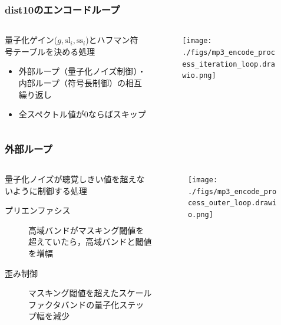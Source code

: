 \documentclass[14pt,xcolor=dvipsnames,table,dvipdfmx]{beamer}
\begin{document}
\begin{frame}[c]
    \frametitle{dist10のエンコードループ}
    \begin{columns}
        \begin{column}{0.6\textwidth}
            量子化ゲイン($g, \mathrm{sl}_{i}, \mathrm{ss}_{i}$)とハフマン符号テーブルを決める処理
            \begin{itemize}
                \item 外部ループ（量子化ノイズ制御）・内部ループ（符号長制御）の相互繰り返し
                \item 全スペクトル値が$0$ならばスキップ
            \end{itemize}
        \end{column}
        \begin{column}{0.4\textwidth}
            \begin{figure}
                \texttt{[image: ./figs/mp3\_encode\_process\_iteration\_loop.drawio.png]}
            \end{figure}
        \end{column}
    \end{columns}
\end{frame}

\begin{frame}[c]
    \frametitle{外部ループ}
    \begin{columns}
        \begin{column}{0.6\textwidth}
            量子化ノイズが聴覚しきい値を超えないように制御する処理
            \begin{description}
                \item[プリエンファシス] 高域バンドがマスキング閾値を超えていたら，高域バンドと閾値を増幅
                \item[歪み制御] マスキング閾値を超えたスケールファクタバンドの量子化ステップ幅を減少
            \end{description}
        \end{column}
        \begin{column}{0.4\textwidth}
            \begin{figure}
                \texttt{[image: ./figs/mp3\_encode\_process\_outer\_loop.drawio.png]}
            \end{figure}
        \end{column}
    \end{columns}
\end{frame}
\end{document}
